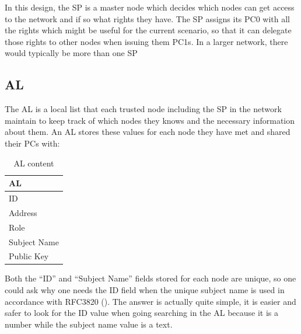 In this design, the \ac{SP} is a master node which decides which nodes can get
access to the network and if so what rights they have. The \ac{SP} assigns its
\ac{PC0} with all the rights which might be useful for the current scenario, so
that it can delegate those rights to other nodes when issuing them \acp{PC1}. In
a larger network, there would typically be more than one \ac{SP}

\subsection{\acf{AL}}
The \ac{AL} is a local list that each trusted node including the \ac{SP} in
the network maintain to keep track of which nodes they knows and the necessary
information about them. An \acl{AL} stores these values for each node they have
met and shared their \acp{PC} with:
\begin{table}[h]
	\centering
	\begin{tabular}{| l |}\hline
 		\textbf{\acl{AL}}\\\hline
		ID\\\hline
		Address \\\hline
		Role \\\hline 
		Subject Name \\\hline 
		Public Key \\\hline  
	\end{tabular}
	\caption{\acf{AL} content}
	\label{tab:al_content}
\end{table}
Both the ``ID'' and ``Subject Name'' fields stored for each node are unique, so
one could ask why one needs the ID field when the unique subject name is used in
accordance with RFC3820 (\cite{rfc3820}). The answer is actually quite simple,
it is easier and safer to look for the ID value when going searching in the
\ac{AL} because it is a number while the subject name value is a text.

